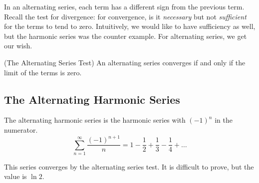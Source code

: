 \documentclass[fleqn]{report}
\begin{document}
In an alternating series, each term has a different sign from
the previous term. Recall the test for divergence: for
convergence, is it \emph{necessary} but not \emph{sufficient}
for the terms to tend to zero. Intuitively, we would like to
have sufficiency as well, but the harmonic series was the
counter example. For alternating series, we get our wish. 

\begin{prop}(The Alternating Series Test) An alternating
series converges if and only if the limit of the terms
is zero.
\end{prop}

\subsection{The Alternating Harmonic Series}
\label{alternating-harmonic}

\begin{defn}
The alternating harmonic series is the harmonic series with
$(-1)^n$ in the numerator.
\begin{equation*}
\sum_{n=1}^\infty \frac{(-1)^{n+1}}{n} = 1 - \frac{1}{2} +
\frac{1}{3} - \frac{1}{4} + \ldots
\end{equation*}\end{defn}
This series converges by the alternating series test. 
It is difficult to prove, but the value is $\ln 2$. 
\end{document}
